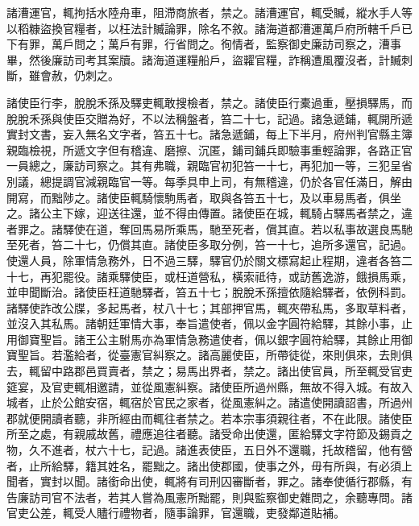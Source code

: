 \begin{pinyinscope}
 諸漕運官，輒拘括水陸舟車，阻滯商旅者，禁之。諸漕運官，輒受贓，縱水手人等以稻糠盜換官糧者，以枉法計贓論罪，除名不敘。諸海道都漕運萬戶府所轄千戶已下有罪，萬戶問之；萬戶有罪，行省問之。徇情者，監察御史廉訪司察之，漕事畢，然後廉訪司考其案牘。諸海道運糧船戶，盜糶官糧，詐稱遭風覆沒者，計贓刺斷，雖會赦，仍刺之。



 諸使臣行李，脫脫禾孫及驛吏輒敢搜檢者，禁之。諸使臣行橐過重，壓損驛馬，而脫脫禾孫與使臣交贈為好，不以法稱盤者，笞二十七，記過。諸急遞鋪，輒開所遞實封文書，妄入無名文字者，笞五十七。諸急遞鋪，每上下半月，府州判官縣主簿親臨檢視，所遞文字但有稽違、磨擦、沉匿，鋪司鋪兵即驗事重輕論罪，各路正官一員總之，廉訪司察之。其有弗職，親臨官初犯笞一十七，再犯加一等，三犯呈省別議，總提調官減親臨官一等。每季具申上司，有無稽違，仍於各官任滿日，解由開寫，而黜陟之。諸使臣輒騎懷駒馬者，取與各笞五十七，及以車易馬者，俱坐之。諸公主下嫁，迎送往還，並不得由傳置。諸使臣在城，輒騎占驛馬者禁之，違者罪之。諸驛使在道，奪回馬易所乘馬，馳至死者，償其直。若以私事故選良馬馳至死者，笞二十七，仍償其直。諸使臣多取分例，笞一十七，追所多還官，記過。使還人員，除軍情急務外，日不過三驛，驛官仍於關文標寫起止程期，違者各笞二十七，再犯罷役。諸乘驛使臣，或枉道營私，橫索祗待，或訪舊逸游，餓損馬乘，並申聞斷治。諸使臣枉道馳驛者，笞五十七；脫脫禾孫擅依隨給驛者，依例科罰。諸驛使詐改公牒，多起馬者，杖八十七；其部押官馬，輒夾帶私馬，多取草料者，並沒入其私馬。諸朝廷軍情大事，奉旨遣使者，佩以金字圓符給驛，其餘小事，止用御寶聖旨。諸王公主駙馬亦為軍情急務遣使者，佩以銀字圓符給驛，其餘止用御寶聖旨。若濫給者，從臺憲官糾察之。諸高麗使臣，所帶徒從，來則俱來，去則俱去，輒留中路郡邑買賣者，禁之；易馬出界者，禁之。諸出使官員，所至輒受官吏筵宴，及官吏輒相邀請，並從風憲糾察。諸使臣所過州縣，無故不得入城。有故入城者，止於公館安宿，輒宿於官民之家者，從風憲糾之。諸遣使開讀詔書，所過州郡就便開讀者聽，非所經由而輒往者禁之。若本宗事須親往者，不在此限。諸使臣所至之處，有親戚故舊，禮應追往者聽。諸受命出使還，匿給驛文字符節及錫貢之物，久不進者，杖六十七，記過。諸進表使臣，五日外不還職，托故稽留，他有營者，止所給驛，籍其姓名，罷黜之。諸出使郡國，使事之外，毋有所與，有必須上聞者，實封以聞。諸銜命出使，輒將有司刑囚審斷者，罪之。諸奉使循行郡縣，有告廉訪司官不法者，若其人嘗為風憲所黜罷，則與監察御史雜問之，余聽專問。諸官吏公差，輒受人贐行禮物者，隨事論罪，官還職，吏發鄰道貼補。




\end{pinyinscope}
